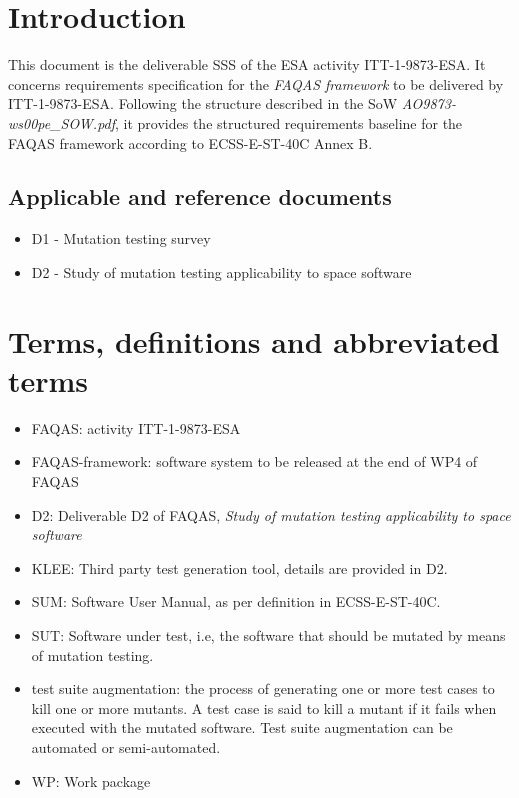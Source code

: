 
\chapter{Introduction}

This document is the deliverable SSS of the ESA activity ITT-1-9873-ESA. It concerns requirements specification for the \emph{FAQAS framework} to be delivered by ITT-1-9873-ESA. Following the structure described in the SoW \emph{AO9873-ws00pe\_SOW.pdf}, it provides the structured requirements baseline for the FAQAS framework according to ECSS-E-ST-40C Annex B.
 
\section{Applicable and reference documents}

\begin{itemize}
\item{D1 - Mutation testing survey}
\item{D2 - Study of mutation testing applicability to space software}
\end{itemize}

\chapter{Terms, definitions and abbreviated terms}

\begin{itemize}
\item{FAQAS}: activity ITT-1-9873-ESA
\item{FAQAS-framework}: software system to be released at the end of WP4 of FAQAS
\item{D2}: Deliverable D2 of FAQAS, \emph{Study of mutation testing applicability to space software}
\item{KLEE}: Third party test generation tool, details are provided in D2.
\item{SUM}: Software User Manual, as per definition in ECSS-E-ST-40C.
\item{SUT}: Software under test, i.e, the software that should be mutated by means of mutation testing.
\item{test suite augmentation}: the process of generating one or more test cases to kill one or more mutants. A test case is said to kill a mutant if it fails when executed with the mutated software. Test suite augmentation can be automated or semi-automated.
\item{WP}: Work package

\end{itemize}

\clearpage
 


